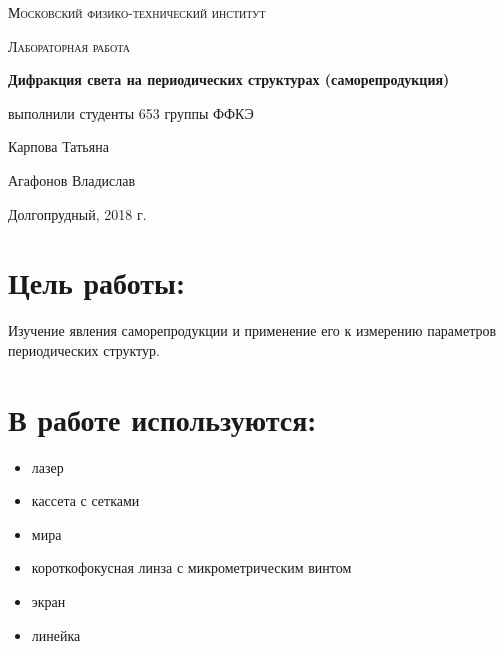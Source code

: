 \documentclass[a4paper]{article}
\begin{document}
\begin{titlepage}
	\centering
	\vspace{5cm}
	{\scshape\LARGE Московский физико-технический институт \par}
	\vspace{4cm}
	{\scshape\Large Лабораторная работа \par}
	\vspace{1cm}
	{\huge\bfseries Дифракция света на периодических структурах (саморепродукция) \par}
	\vspace{1cm}
	\vfill
\begin{flushright}
	{\large выполнили студенты 653 группы ФФКЭ}\par
	\vspace{0.3cm}
	{\LARGE Карпова Татьяна} \par
		\vspace{0.3cm}
	{\LARGE Агафонов Владислав}
\end{flushright}
	

	\vfill

	Долгопрудный, 2018 г.
\end{titlepage}

\section{Цель работы:}
Изучение явления саморепродукции и применение его к измерению параметров периодических структур.

\section{В работе используются:}
\begin{itemize}
    \item лазер
    \item кассета с сетками
    \item мира
    \item короткофокусная линза с микрометрическим винтом
    \item экран
    \item линейка
\end{itemize}
\end{document}
